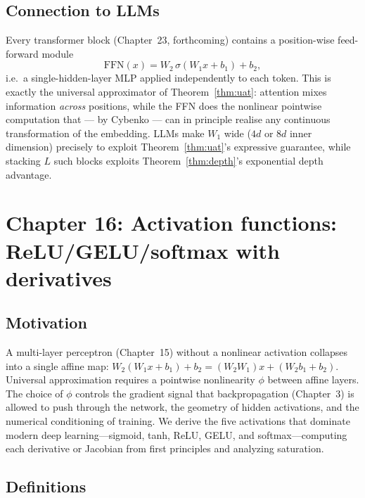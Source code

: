 \documentclass[11pt]{article}
\theoremstyle{remark}
\begin{document}
\subsection*{Connection to LLMs}

Every transformer block (Chapter~23, forthcoming) contains a position-wise feed-forward module
\[
\mathrm{FFN}(x) = W_2\, \sigma(W_1 x + b_1) + b_2,
\]
i.e.\ a single-hidden-layer MLP applied independently to each token. This is exactly the universal approximator of Theorem~\ref{thm:uat}: attention mixes information \emph{across} positions, while the FFN does the nonlinear pointwise computation that --- by Cybenko --- can in principle realise any continuous transformation of the embedding. LLMs make $W_1$ wide ($4d$ or $8d$ inner dimension) precisely to exploit Theorem~\ref{thm:uat}'s expressive guarantee, while stacking $L$ such blocks exploits Theorem~\ref{thm:depth}'s exponential depth advantage.


\section*{Chapter 16: Activation functions: ReLU/GELU/softmax with derivatives}

\subsection*{Motivation}

A multi-layer perceptron (Chapter~15) without a nonlinear activation collapses into a single affine map: $W_2(W_1 x + b_1) + b_2 = (W_2 W_1) x + (W_2 b_1 + b_2)$. Universal approximation requires a pointwise nonlinearity $\phi$ between affine layers. The choice of $\phi$ controls the gradient signal that backpropagation (Chapter~3) is allowed to push through the network, the geometry of hidden activations, and the numerical conditioning of training. We derive the five activations that dominate modern deep learning---sigmoid, tanh, ReLU, GELU, and softmax---computing each derivative or Jacobian from first principles and analyzing saturation.

\subsection*{Definitions}
\end{document}
